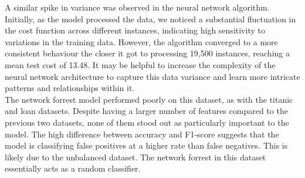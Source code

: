 \documentclass{article}
\begin{document}
A similar spike in variance was observed in the neural network algorithm. 
Initially, as the model processed the data, 
we noticed a substantial fluctuation in the cost function across different instances, 
indicating high sensitivity to variations in the training data. 
However, the algorithm converged to a more consistent behaviour the closer it got to processing 19,500 instances,
reaching a mean test cost of 13.48.
It may be helpful to increase the complexity of the neural network architecture to capture this data variance
and learn more intricate patterns and relationships within it.
\\

The network forrest model performed poorly on this dataset, as with the titanic and loan datasets. Despite having a larger number of 
features compared to the previous two datasets, none of them stood out as particularly important to the model. The high difference between accuracy
and F1-score suggests that the model is classifying false positives at a higher rate than false negatives. This is likely due to the unbalanced dataset. The network forrest in this dataset
essentially acts as a random classifier.
\end{document}
